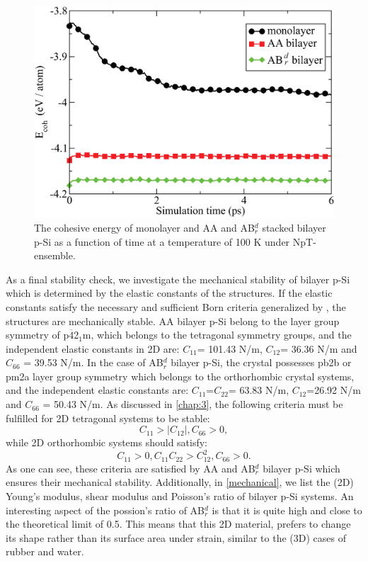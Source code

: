 \begin{figure}[htbp]
\centering
\includegraphics[width=0.7\linewidth]{ps_ab_initio_MD_100K.eps}%
\caption{The cohesive energy of monolayer and AA and AB$_r^d$ stacked bilayer p-Si as a function of time at a temperature of 100 K under NpT-ensemble. \label{fig:ps_MD}}
\end{figure}

As a final stability check, we investigate the mechanical stability of bilayer p-Si which is determined by the elastic constants of the structures. If the elastic constants satisfy the necessary and sufficient Born criteria generalized by \citet{Mouhat2014}, the structures are mechanically stable. AA bilayer p-Si belong to the layer group symmetry of p$\overline{4}$2$_1$m, which belongs to the tetragonal symmetry groups, and the independent elastic constants in 2D are: $C_{11}$= 101.43 N/m, $C_{12}$= 36.36 N/m and $C_{66}$ = 39.53  N/m. In the case of AB$_r^d$ bilayer p-Si, the crystal possesses pb2b or pm2a layer group symmetry which belongs to the orthorhombic crystal systems, and the independent elastic constants are: $C_{11}$=$C_{22}$= 63.83 N/m, $C_{12}$=26.92 N/m and $C_{66}$ = 50.43 N/m.  As discussed in \autoref{chap:3}, the following criteria must be fulfilled for 2D tetragonal systems to be stable:
\begin{equation}
C_{11}>|C_{12}|, C_{66}>0,
\end{equation}
while 2D orthorhombic systems should satisfy:
\begin{equation}
C_{11}>0,C_{11}C_{22}>C_{12}^2, C_{66}>0.
\end{equation}
As one can see, these criteria are satisfied by AA and AB$_r^d$ bilayer p-Si which ensures their mechanical stability. Additionally, in \autoref{mechanical}, we list the  (2D) Young's modulus, shear modulus and Poisson's ratio of bilayer p-Si systems. An interesting aspect of the possion's ratio of AB$_r^d$ is that it is quite high and close to the theoretical limit of 0.5. This means that this 2D material, prefers to change its shape rather than its surface area under strain, similar to the (3D) cases of rubber and water.


